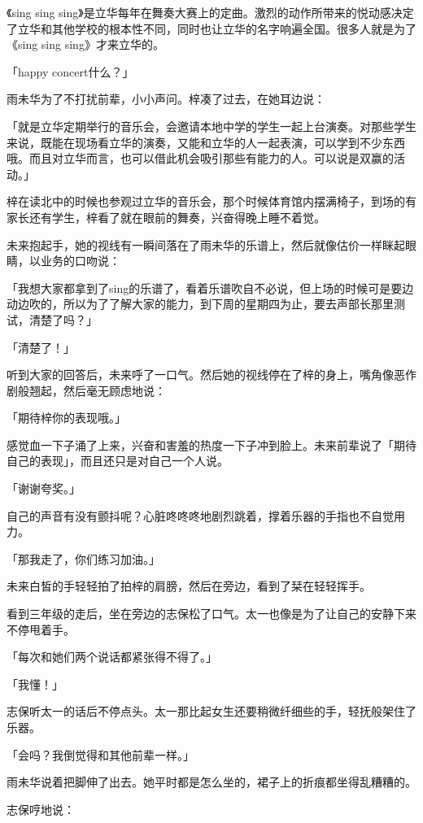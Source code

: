 \documentclass[UTF8]{ctexart}
\begin{document}
    《sing sing sing》是立华每年在舞奏大赛上的定曲。激烈的动作所带来的悦动感决定了立华和其他学校的根本性不同，同时也让立华的名字响遍全国。很多人就是为了《sing sing sing》才来立华的。

    「happy concert什么？」

    雨未华为了不打扰前辈，小小声问。梓凑了过去，在她耳边说：

    「就是立华定期举行的音乐会，会邀请本地中学的学生一起上台演奏。对那些学生来说，既能在现场看立华的演奏，又能和立华的人一起表演，可以学到不少东西哦。而且对立华而言，也可以借此机会吸引那些有能力的人。可以说是双赢的活动。」

    梓在读北中的时候也参观过立华的音乐会，那个时候体育馆内摆满椅子，到场的有家长还有学生，梓看了就在眼前的舞奏，兴奋得晚上睡不着觉。

    未来抱起手，她的视线有一瞬间落在了雨未华的乐谱上，然后就像估价一样眯起眼睛，以业务的口吻说：

    「我想大家都拿到了sing的乐谱了，看着乐谱吹自不必说，但上场的时候可是要边动边吹的，所以为了了解大家的能力，到下周的星期四为止，要去声部长那里测试，清楚了吗？」

    「清楚了！」

    听到大家的回答后，未来呼了一口气。然后她的视线停在了梓的身上，嘴角像恶作剧般翘起，然后毫无顾虑地说：

    「期待梓你的表现哦。」

    感觉血一下子涌了上来，兴奋和害羞的热度一下子冲到脸上。未来前辈说了「期待自己的表现」，而且还只是对自己一个人说。

    「谢谢夸奖。」

    自己的声音有没有颤抖呢？心脏咚咚咚地剧烈跳着，撑着乐器的手指也不自觉用力。

    「那我走了，你们练习加油。」

    未来白皙的手轻轻拍了拍梓的肩膀，然后在旁边，看到了栞在轻轻挥手。

    看到三年级的走后，坐在旁边的志保松了口气。太一也像是为了让自己的安静下来不停甩着手。

    「每次和她们两个说话都紧张得不得了。」

    「我懂！」

    志保听太一的话后不停点头。太一那比起女生还要稍微纤细些的手，轻抚般架住了乐器。

    「会吗？我倒觉得和其他前辈一样。」

    雨未华说着把脚伸了出去。她平时都是怎么坐的，裙子上的折痕都坐得乱糟糟的。

    志保哼地说：
\end{document}
